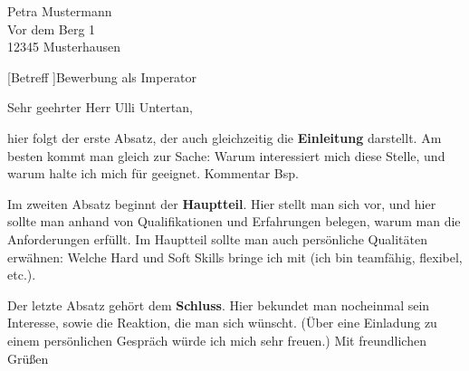 \emergencystretch=20pt%
\begin{letter}{%
Petra Mustermann\\
Vor dem Berg 1\\
12345 Musterhausen%
}


[Betreff ]{Bewerbung als Imperator}
\opening{Sehr geehrter Herr Ulli Untertan,}

hier folgt der erste Absatz, der auch gleichzeitig die \textbf{Einleitung} darstellt. Am besten kommt man gleich zur Sache: Warum interessiert mich diese Stelle, und warum halte ich mich für geeignet.  Kommentar \glqq Bsp\grqq .

Im zweiten Absatz beginnt der \textbf{Hauptteil}. Hier stellt man sich vor, und hier sollte man anhand von Qualifikationen und Erfahrungen belegen, warum man die Anforderungen erfüllt. Im Hauptteil sollte man auch persönliche Qualitäten erwähnen: Welche Hard und Soft Skills bringe ich mit (ich bin teamfähig, flexibel, etc.).

Der letzte Absatz gehört dem \textbf{Schluss}. Hier bekundet man nocheinmal sein Interesse, sowie die Reaktion, die man sich wünscht. (Über eine Einladung zu einem persönlichen Gespräch würde ich mich sehr freuen.)
\newline\newline\newline 
Mit freundlichen Grüßen\\\sig
\encl{}
\end{letter}
